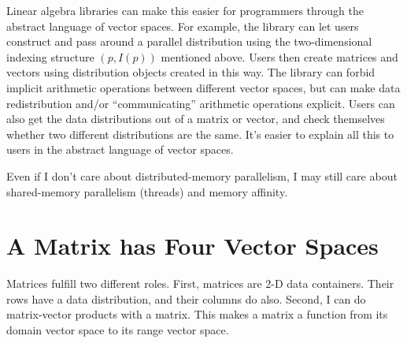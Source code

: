 Linear algebra libraries can make this easier for programmers through the
abstract language of vector spaces.  For example, the library can let users
construct and pass around a parallel distribution using the two-dimensional
indexing structure $(p, I(p))$ mentioned above.  Users then create
matrices and vectors using distribution objects created in this way.  The
library can forbid implicit arithmetic operations between different vector
spaces, but can make data redistribution and/or ``communicating'' arithmetic
operations explicit.  Users can also get the data distributions out of a matrix
or vector, and check themselves whether two different distributions are the
same.  It's easier to explain all this to users in the abstract language of
vector spaces.

Even if I don't care about distributed-memory parallelism, I may still care
about shared-memory parallelism (threads) and memory affinity.

\section{A Matrix has Four Vector Spaces}

Matrices fulfill two different roles.  First, matrices are 2-D data containers.
Their rows have a data distribution, and their columns do also.  Second, I can
do matrix-vector products with a matrix.  This makes a matrix a function from
its domain vector space to its range vector space.
